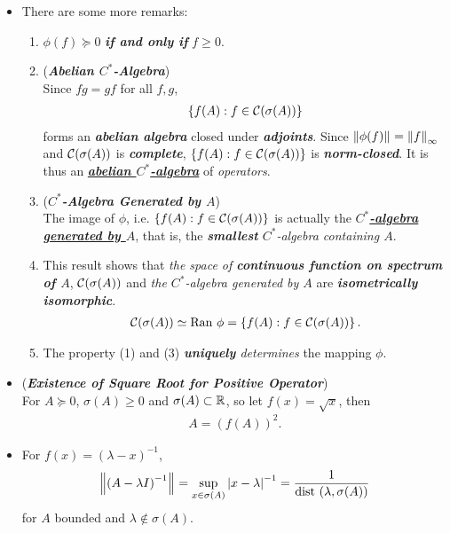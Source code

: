 \documentclass[11pt]{article}
\begin{document}
\begin{itemize}
\item \begin{remark}
There are some more remarks:
\begin{enumerate}
\item $\phi(f) \succeq 0$  \emph{\textbf{if and only if}} $f \ge 0$.
\item (\textbf{\emph{Abelian $C^{*}$-Algebra}})\\
 Since $fg = gf$ for all $f, g$, 
\begin{align*}
\left\{f(A): f \in {\mathcal C}(\sigma(A))\right\}
\end{align*} forms an \emph{\textbf{abelian algebra}} closed under \emph{\textbf{adjoints}}.  Since  $\left\|\phi(f)\right\|_{} = \left\|f\right\|_{\infty}$  and ${\mathcal C}(\sigma(A))$ is \emph{\textbf{complete}},  $\left\{f(A): f \in {\mathcal C}(\sigma(A))\right\}$ is \emph{\textbf{norm-closed}}. It is thus an \underline{\emph{\textbf{abelian $C^{*}$-algebra}}} of 
\emph{operators}.  
\item  (\textbf{\emph{$C^{*}$-Algebra Generated by $A$}})\\
 The image of $\phi$, i.e. $\left\{f(A): f \in {\mathcal C}(\sigma(A))\right\}$ is actually the \underline{\emph{\textbf{$C^{*}$-algebra generated by $A$}}}, that is, the \emph{\textbf{smallest} $C^{*}$-algebra containing $A$}. 
 
 \item This result shows that \emph{the space of \textbf{continuous function on spectrum of $A$}}, ${\mathcal C}(\sigma(A))$ and \emph{the $C^{*}$-algebra generated by $A$} are \emph{\textbf{isometrically isomorphic}}.
 \begin{align*}
 {\mathcal C}(\sigma(A)) \simeq \text{Ran }\phi = \left\{f(A): f \in {\mathcal C}(\sigma(A))\right\}.
 \end{align*}
 
 \item The property (1) and (3) \emph{\textbf{uniquely} determines} the mapping $\phi$.
\end{enumerate}
\end{remark}

\item \begin{example} (\emph{\textbf{Existence of Square Root for Positive Operator}})\\
For $A \succeq 0$, $\sigma(A) \ge 0$ and $\sigma(A) \subset {\mathbb R}$, so let $f(x) = \sqrt{x}$, then
\begin{align*}
A = (f(A))^2.
\end{align*}
\end{example}

\item \begin{example}
For $f(x) = (\lambda  - x)^{-1}$,
\begin{align*}
\left\|\left(A - \lambda I\right)^{-1}\right\|_{} = \sup_{x \in \sigma(A)}\left\lvert x - \lambda  \right\rvert^{-1} = \frac{1}{\text{dist }(\lambda, \sigma(A))}
\end{align*} for $A$ bounded and $\lambda \not\in \sigma(A)$.
\end{example}
\end{itemize}
\end{document}
